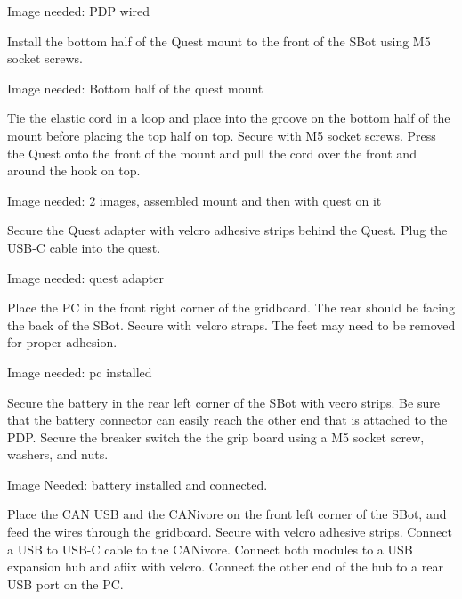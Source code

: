 \begin{tipbox}
    Image needed: PDP wired
\end{tipbox}

Install the bottom half of the Quest mount to the front of the SBot using M5 socket screws.

\begin{tipbox}
    Image needed: Bottom half of the quest mount
\end{tipbox}

Tie the elastic cord in a loop and place into the groove on the bottom half of the mount before placing the top half on top. Secure with M5 socket screws. Press the Quest onto the front of the mount and pull the cord over the front and around the hook on top.

\begin{tipbox}
    Image needed: 2 images, assembled mount and then with quest on it
\end{tipbox}

Secure the Quest adapter with velcro adhesive strips behind the Quest. Plug the USB-C cable into the quest.

\begin{tipbox}
    Image needed: quest adapter
\end{tipbox}

Place the PC in the front right corner of the gridboard. The rear should be facing the back of the SBot. Secure with velcro straps. The feet may need to be removed for proper adhesion. 

\begin{tipbox}
    Image needed: pc installed
\end{tipbox}

Secure the battery in the rear left corner of the SBot with vecro strips. Be sure that the battery connector can easily reach the other end that is attached to the PDP. Secure the breaker switch the the grip board using a M5 socket screw, washers, and nuts.

\begin{tipbox}
    Image Needed: battery installed and connected.
\end{tipbox}

Place the CAN USB and the CANivore on the front left corner of the SBot, and feed the wires through the gridboard. Secure with velcro adhesive strips. Connect a USB to USB-C cable to the CANivore. Connect both modules to a USB expansion hub and afiix with velcro. Connect the other end of the hub to a rear USB port on the PC.

